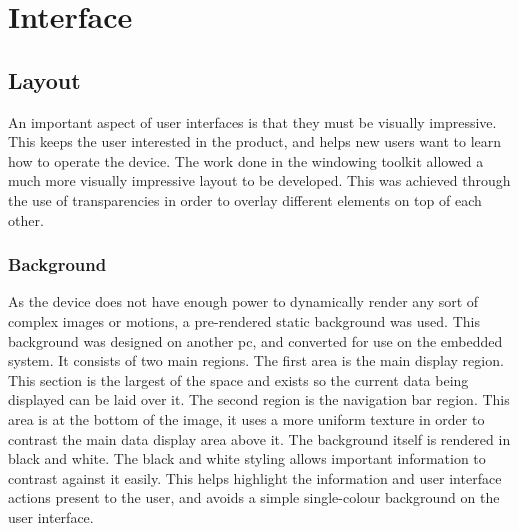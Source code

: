 
\chapter{Interface} %



\ifpdf
    \graphicspath{{6/figures/PNG/}{6/figures/PDF/}{6/figures/}}
\else
    \graphicspath{{6/figures/EPS/}{6/figures/}}
\fi



\section{Layout}

An important aspect of user interfaces is that they must be visually impressive. This keeps the user interested in the product, and helps new users want to learn how to operate the device. The work done in the windowing toolkit allowed a much more visually impressive layout to be developed. This was achieved through the use of transparencies in order to overlay different elements on top of each other.

\subsection{Background}

As the device does not have enough power to dynamically render any sort of complex images or motions, a pre-rendered static background was used. This background was designed on another pc, and converted for use on the embedded system. It consists of two main regions. The first area is the main display region. This section is the largest of the space and exists so the current data being displayed can be laid over it. The second region is the navigation bar region. This area is at the bottom of the image, it uses a more uniform texture in order to contrast the main data display area above it. The background itself is rendered in black and white. The black and white styling allows important information to contrast against it easily. This helps highlight the information and user interface actions present to the user, and avoids a simple single-colour background on the user interface.

